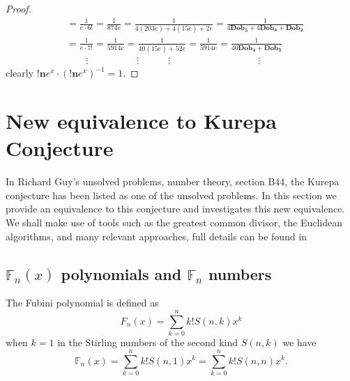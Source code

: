 \documentclass[pdflatex,sn-mathphys-num]{sn-jnl}%
\theoremstyle{thmstyleone}%
\theoremstyle{thmstyletwo}%
\theoremstyle{thmstylethree}%
\begin{document}
\begin{proof}
\begin{align*}
& = \frac{1}{e\cdotp 6!} =\frac{1}{874e}=\frac{1}{4(203e) + 4(15e) + 2e }=\frac{1}{4\mathbf{Dob_5} + 4\mathbf{Dob_4} + \mathbf{Dob_2} }\\
& = \frac{1}{e\cdotp 7!} =\frac{1}{5914e}=\frac{1}{40(15e) + 52e}=\frac{1}{5914e}=\frac{1}{40\mathbf{Dob_4} + \mathbf{Dob_3}}\\
&\quad \quad \vdots\quad \quad \quad \quad \quad \vdots \quad \quad \quad\vdots \quad \quad \quad \quad \quad \quad \quad \quad  \quad\vdots \quad \quad
\end{align*} 
clearly  $\mathbf{!n}e^x \cdotp (\mathbf{!n} e^x)^{-1}=1.$ 
\end{proof}


\section{New equivalence to Kurepa Conjecture }\label{NewConj}
In Richard Guy's unsolved problems, number theory, section B44, the Kurepa conjecture has been listed as one of the unsolved problems. In this section we provide an equivalence to this conjecture and investigates this new equivalence. We shall make use of tools such as the greatest common divisor, the Euclidean algorithms, and many relevant approaches, full details can be found in \cite{stein1967computational, knuth2014art, sorenson1990k, sorenson1994two, williams1945numbers, fabianogcd}

\subsection{$\mathbb{F}_{n}(x)$ polynomials and $\mathbb{F}_{n}$ numbers}
The Fubini polynomial \cite{https://doi.org/10.1155/IJMMS.2005.3849} is defined as 
$$F_n(x)= \sum_{k=0}^{n}k! S(n,k)x^k$$
when $k=1$ in the Stirling numbers of the second kind $S(n,k)$ we have 
\begin{equation}\label{Fub}
    \mathbb{F}_n(x) = \sum_{k=0}^n k! S(n,1)x^k=\sum_{k=0}^n k! S(n,n)x^k.
\end{equation}
\end{document}
